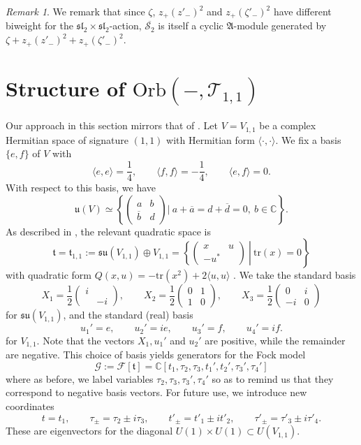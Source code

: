 \documentclass[reqno, 11pt]{amsart} %
\numberwithin{equation}{section}
\theoremstyle{plain}
\theoremstyle{definition}
\theoremstyle{remark}
\newtheorem{remark}[theorem]{Remark}
\newcommand{\ov}{\overline}
\newcommand{\tr}{\mathrm{tr}}
\newcommand{\mcS}{\mathcal{S}}
\newcommand{\mcT}{\mathcal{T}}
\newcommand{\mfA}{\mathfrak{A}}
\newcommand{\mfl}{\mathfrak{l}}
\newcommand{\mfs}{\mathfrak{s}}
\newcommand{\mfsl}{\mfs\mfl}
\newcommand{\bbC}{\mathbb C}
\newcommand{\calF}{\mathcal F}
\newcommand{\calG}{\mathcal G}
\newcommand{\lie}[1]{ \mathfrak{#1}}
\newcommand{\Orb}{\mathrm{Orb}}
\begin{document}
\begin{remark}
We remark that since $ζ$, $z_+(z'_-)^2$ and $z_+(ζ'_-)^2$ have different biweight for the $\mfsl_2\times \mfsl_2$-action, $\ov{\mcS_2}$ is itself a cyclic $\mfA$-module generated by $ζ + z_+(z'_-)^2 + z_+(ζ'_-)^2$.
\end{remark}

\section{Structure of $\Orb(-,{\mcT_{1,1}})$}
Our approach in this section mirrors that of . Let $V = V_{1,1}  $ be a complex Hermitian space of signature $(1,1)$ with Hermitian form $\langle \cdot, \cdot \rangle$. We fix a basis $\{ e,f\}$ of $V$ with 
\[
\langle e,e\rangle = \frac14, \qquad \langle f,f\rangle = -\frac14, \qquad \langle e,f \rangle = 0.
\]
With respect to this basis, we have
\[
\lie u(V) \simeq \left\{   \begin{pmatrix} a & b \\ \overline b & d \end{pmatrix} \Big| \ a + \overline a = d + \overline d = 0  , \ b \in \mathbb C \right\}.
\]
As described in , the relevant quadratic space is
\[
\lie{t} = \lie{t}_{1,1} := \lie{su}(V_{1,1}) \oplus  V_{1,1} = \left.\left\{  \begin{pmatrix} x & u \\- u^* \end{pmatrix} \ \right\vert \ \tr(x)= 0 \right\}
\]
with quadratic form $Q(x,u) = -\tr(x^2) + 2 \langle u, u \rangle$  .  We take the standard basis
\[
X_1 = \frac{1}{ 2} \begin{pmatrix} i & \\ & -i \end{pmatrix}, \qquad X_2 = \frac{1}{ 2} \begin{pmatrix} 0 & 1 \\ 1 & 0 \end{pmatrix}, \qquad X_3 = \frac{1}{ 2} \begin{pmatrix} 0 & i \\ -i & 0 \end{pmatrix}
\]
for $\lie {su}(V_{1,1})$, and the standard (real) basis
\begin{equation*}
u_1' = e , \qquad   u_2' = ie , \qquad u_3' = f , \qquad u_4' = if.
\end{equation*}
for $V_{1,1}$. Note that the vectors $X_1, u_1'$ and $u_2'$ are positive, while the remainder are negative. This choice of basis yields generators for the Fock model
\[
\calG :=   \calF[\lie t] = \bbC[ t_1, \tau_2, \tau_3, t_1', t_2', \tau_3', \tau_4']
\]
where as before, we label  variables $τ_2, \tau_3, \tau_3', \tau_4'$ so as to remind us that they correspond to negative basis vectors. For future use, we introduce new coordinates
\[
t = t_1, \qquad \tau_{\pm} = \tau_2 \pm i \tau_3, \qquad t'_{\pm} = t'_1 \pm i t'_2, \qquad \tau'_{\pm} = \tau'_3 \pm i \tau'_4.
\]
These are eigenvectors for the diagonal $U(1)\times U(1)\subset U(V_{1,1})$.
\end{document}
